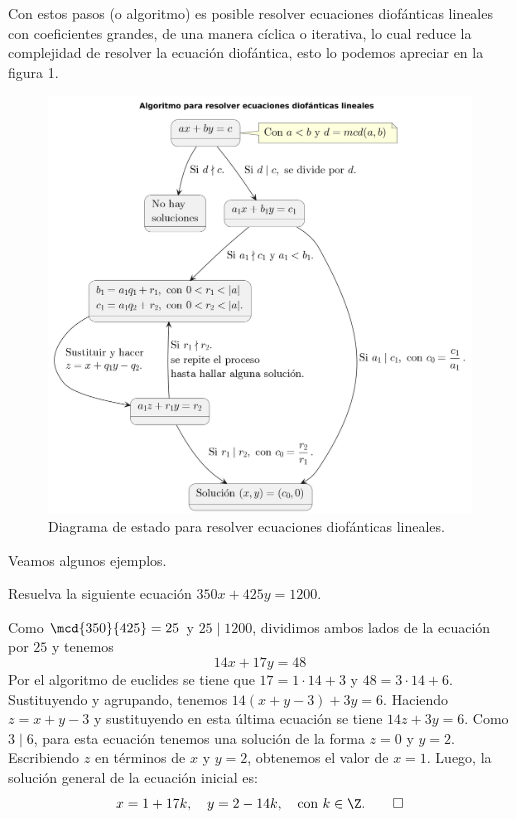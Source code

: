 \documentclass[12pt]{article}
\begin{document}
    Con estos pasos (o algoritmo) es posible resolver ecuaciones diofánticas lineales con coeficientes grandes, de una manera
    cíclica o iterativa, lo cual reduce la complejidad de resolver la ecuación diofántica, esto lo podemos apreciar en la
    figura 1.
    \begin{figure}[H]
        \centering
        \includegraphics[width=\textwidth]{aplicando-algoritmo-de-euclides}
        \caption{Diagrama de estado para resolver ecuaciones diofánticas lineales.}
    \end{figure}

    Veamos algunos ejemplos.

    \begin{example}
        Resuelva la siguiente ecuación $350x + 425y = 1200$.
    \end{example}
    \begin{solution}
        Como $\mcd{350}{425} = 25$ y $25 \mid 1200$, dividimos ambos lados de la ecuación por $25$ y tenemos
        \[
            14x+17y=48
        \]
        Por el algoritmo de euclides se tiene que $17 = 1\cdot14+3$ y $48=3\cdot14+6$.
        Sustituyendo y agrupando, tenemos $14(x+y-3)+3y=6.$
        Haciendo $z=x+y-3$ y sustituyendo en esta última ecuación se tiene $14z+3y=6.$
        Como $3\mid6$, para esta ecuación tenemos una solución de la forma $z=0$ y $y=2$.
        Escribiendo $z$ en términos de $x$ y $y=2$, obtenemos el valor de $x=1$.
        Luego, la solución general de la ecuación inicial es:
        \[
            x=1+17k, \quad y=2-14k, \quad\text{con}\ k \in \Z. \qedhere
        \]
    \end{solution}
\end{document}
